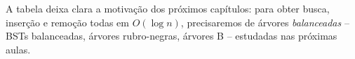 \documentclass[9pt,a4paper]{extarticle}
\newcommand{\impt}[1]{\textcolor{important}{#1}}
\theoremstyle{definition}
\begin{document}
A tabela deixa clara a motivação dos próximos capítulos: para obter \impt{busca, inserção e remoção todas em $O(\log n)$}, precisaremos de árvores \emph{balanceadas} -- BSTs balanceadas, árvores rubro-negras, árvores B -- estudadas nas próximas aulas.



\end{document}
